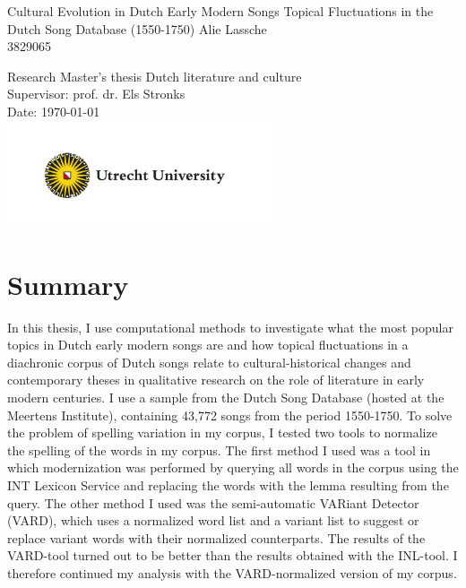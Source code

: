 \documentclass[a4paper,12pt,openright,twoside,unknownkeysallowed]{book}
\begin{document}
	\thispagestyle{empty}
	\newpage
	\vskip10cm
	\begin{center}
		\huge{Cultural Evolution in Dutch Early Modern Songs}
		\vskip2mm
		\LARGE{Topical Fluctuations in the Dutch Song Database (1550-1750)}
		\vskip10mm
		\Large{Alie Lassche}\\
		\vskip2mm
		\normalsize{3829065}

		\normalsize
	\end{center}
	\vskip88mm
	\begin{center}
		\Large
		Research Master's thesis Dutch literature and culture\\
		Supervisor: prof. dr. Els Stronks\\
		Date: \today\\
		\includegraphics[width=8cm]{images/UUlogo}
	\end{center}
\chapter*{Summary}
In this thesis, I use computational methods to investigate what the most popular topics in Dutch early modern songs are and how topical fluctuations in a diachronic corpus of Dutch songs relate to cultural-historical changes and contemporary theses in qualitative research on the role of literature in early modern centuries. I use a sample from the Dutch Song Database (hosted at the Meertens Institute), containing 43,772 songs from the period 1550-1750. To solve the problem of spelling variation in my corpus, I tested two tools to normalize the spelling of the words in my corpus. The first method I used was a tool in which modernization was performed by querying all words in the corpus using the INT Lexicon Service and replacing the words with the lemma resulting from the query. The other method I used was the semi-automatic VARiant Detector (VARD), which uses a normalized word list and a variant list to suggest or replace variant words with their normalized counterparts. The results of the VARD-tool turned out to be better than the results obtained with the INL-tool. I therefore continued my analysis with the VARD-normalized version of my corpus.
\end{document}
